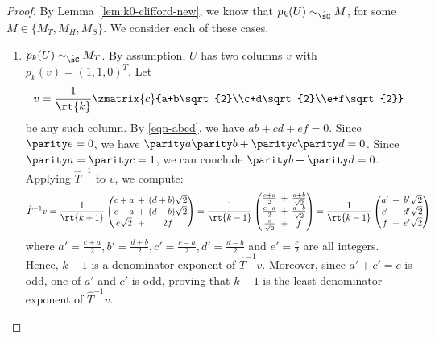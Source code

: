 \documentclass{article}
\begin{document}
\begin{proof}
  By Lemma~\ref{lem:k0-clifford-new}, we know that
  $p_k(U)\sim_{\hat\sC} M$, for some $M\in\{M_T, M_H, M_S\}$. We consider each
  of these cases.
  \begin{enumerate}
    \item \label{lemparitycase:applyt}$p_k(U) \sim_{\hat\sC} M_T$.
      By assumption, $U$ has two columns $v$ with $p_k(v) = (1,1,0)^T$.
      Let
      \[ v =
      \frac{1}{\rt{k}}\zmatrix{c}{a+b\sqrt{2}\\c+d\sqrt{2}\\e+f\sqrt{2}}
      \]
      be any such column. By {\eqref{eqn-abcd}}, we have $ab+cd+ef =
      0$. Since $\parity e = 0$, we have $\parity a \parity b+ \parity
      c \parity d = 0$. Since $\parity a = \parity c = 1$, we can
      conclude $\parity b+\parity d = 0$.  Applying $\hat{T}^{-1}$ to
      $v$, we compute:
      \[\hat{T}^{-1}v = \frac{1}{\rt{k+1}}
      \arraycolsep=.5ex
      \begin{pmatrix}
        c+a &+& (d+b)\sqrt{2} \\
        c-a &+& (d-b)\sqrt{2} \\
        e\sqrt{2} &+& 2f
      \end{pmatrix}
      = \frac{1}{\rt{k-1}}
      \begin{pmatrix}
        \frac{c+a}{2} &+& \frac{d+b}{\sqrt{2}} \\
        \frac{c-a}{2} &+& \frac{d-b}{\sqrt{2}} \\
        \frac{e}{\sqrt{2}} &+& f
      \end{pmatrix}
      = \frac{1}{\rt{k-1}}
      \begin{pmatrix}
        a' &+& b'{\sqrt{2}} \\
        c' &+& d'{\sqrt{2}} \\
        f &+ & e'{\sqrt{2}}
      \end{pmatrix}
      \]
      where $a' = \frac{c+a}{2}, b' = \frac{d+b}{2}, c' =
      \frac{c-a}{2}, d' = \frac{d-b}{2}$ and $e' = \frac{e}{2}$ are
      all integers. Hence, $k-1$ is a denominator exponent of
      $\hat{T}^{-1}v$. Moreover, since $a'+c'=c$ is odd, one of $a'$
      and $c'$ is odd, proving that $k-1$ is the least denominator
      exponent of $\hat{T}^{-1}v$.


\end{enumerate}
\end{proof}
\end{document}

